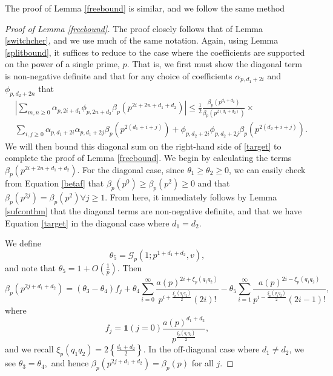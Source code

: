 \documentclass[12pt]{amsart}
\numberwithin{equation}{section}
\numberwithin{thm}{section}
\newcommand{\1}{\mathbf 1}
\begin{document}
	The proof of Lemma \ref{freebound} is similar, and we follow the same method
	\begin{proof}[Proof of Lemma \ref{freebound}]
		The proof closely follows that of Lemma \ref{switchcher}, and we use much of the same notation. Again, using Lemma \ref{splitbound}, it suffices to reduce to the case where the coefficients are supported on the power of a single prime, $p$. That is, we first must show the diagonal term is non-negative definite and that for any choice of coefficients $\alpha_{p,d_1+2i}$ and $\phi_{p,d_2+2n}$ that
		\begin{align}\nonumber&
			\left|\sum_{m,n\ge 0} \alpha_{p, 2i+d_1}\phi_{p,2n+d_2}\beta_p(p^{2i+2n+d_1+d_2})\right|\le \frac{1}{2}\frac{\beta_p(p^{d_1+d_2})}{\beta_p(p^{2(d_1+d_2)})}\times \\&\sum_{i,j\ge 0} \alpha_{p, d_1+2i}\alpha_{p, d_1+2j} \beta_p(p^{2(d_1+i+j)})+\phi_{p, d_2+2i}\phi_{p, d_2+2j} \beta_p(p^{2(d_2+i+j)}).\label{target}
		\end{align}
		We will then bound this diagonal sum on the right-hand side of \eqref{target} to complete the proof of Lemma \ref{freebound}.
		We begin by calculating the terms $\beta_p(p^{2i+2n+d_1+d_2})$.	
		For the diagonal case, since $\theta_1\ge \theta_2\ge 0$, we can easily check from Equation \eqref{betaf} that $\beta_p(p^0)\ge \beta_p(p^2)\ge 0$ and that $\beta_p(p^{2j})=\beta_p(p^2)\forall j\ge 1$. From here, it immediately follows by Lemma \ref{sufconthm} that the diagonal terms are non-negative definite, and that we have Equation \eqref{target} in the diagonal case where $d_1=d_2.$

		We define \begin{equation}\theta_5=\mathcal{G}_p(1;p^{1+d_1+d_2},v),\end{equation} and note that $\theta_5=1+O\left(\frac{1}{p}\right)$.
		Then \begin{equation}\label{evalbeta}
			\beta_p(p^{2j+d_1+d_2})=(\theta_3-\theta_4)f_j +\theta_4\sum^{\infty}_{i=0}  \frac{a(p)^{2i+\xi_{p}(q_1q_2)}}{p^{i+\frac{\xi_p(q_1q_2)}{2}}(2i)!}-\theta_5\sum^\infty_{i=1}\frac{a(p)^{2i-\xi_{p}(q_1q_2)}}{p^{i-\frac{\xi_p(q_1q_2)}{2}}(2i-1)!}, 
		\end{equation} where \begin{equation}
			f_j=\mathbf{1}(j=0)\frac{a(p)^{d_1+d_2}}{p^{\frac{\xi_p(q_1q_2)}{2}}},
		\end{equation}
		and we recall $\xi_p(q_1q_2)=2\left\{\frac{d_1+d_2}{2}\right\}.$
		In the off-diagonal case where $d_1\ne d_2$, we see $\theta_3=\theta_4,$ and hence $\beta_p(p^{2j+d_1+d_2})=\beta_p(p)$ for all $j$.
		

\end{proof}
\end{document}
